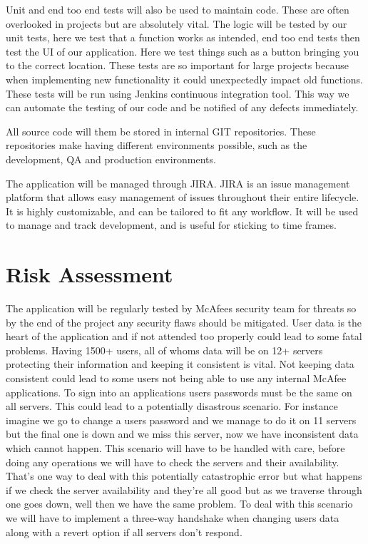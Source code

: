 Unit and end too end tests will also be used to maintain code. These are often overlooked in projects but are absolutely vital. The logic will be tested by our unit tests, here we test that a function works as intended, end too end tests then test the UI of our application. Here we test things such as a button bringing you to the correct location. These tests are so important for large projects because when implementing new functionality it could unexpectedly impact old functions. These tests will be run using Jenkins continuous integration tool. This way we can automate the testing of our code and be notified of any defects immediately.

All source code will them be stored in internal GIT repositories. These repositories make having different environments possible, such as the development, QA and production environments. 

The application will be managed through JIRA. JIRA is an issue management platform that allows easy management of issues throughout their entire lifecycle. It is highly customizable, and can be tailored to fit any workflow. It will be used to manage and track development, and is useful for sticking to time frames. 

\section{Risk Assessment}
The application will be regularly tested by McAfees security team for threats so by the end of the project any security flaws should be mitigated. User data is the heart of the application and if not attended too properly could lead to some fatal problems. Having 1500+ users, all of whoms data will be on 12+ servers protecting their information and keeping it consistent is vital. Not keeping data consistent could lead to some users not being able to use any internal McAfee applications. To sign into an applications users passwords must be the same on all servers. This could lead to a potentially disastrous scenario. For instance imagine we go to change a users password and we manage to do it on 11 servers but the final one is down and we miss this server, now we have inconsistent data which cannot happen. This scenario will have to be handled with care, before doing any operations we will have to check the servers and their availability. That's one way to deal with this potentially catastrophic error but what happens if we check the server availability and they're all good but as we traverse through one goes down, well then we have the same problem. To deal with this scenario we will have to implement a three-way handshake when changing users data along with a revert option if all servers don't respond.  

